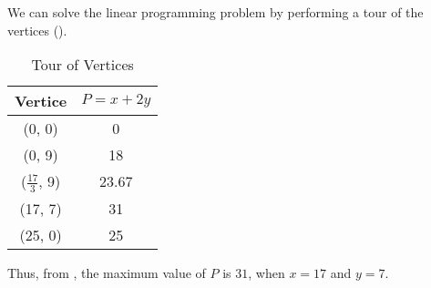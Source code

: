 \begin{subquestions}
\begin{subsubquestions}
\subsubquestion

We can solve the linear programming problem by performing a tour of the vertices ().

\begin{table}[H]
	\centering
	\begin{tabular}{|c|c|}
		\hline
		Vertice & $P = x + 2y$ \\
		\hline
		(0, 0) & 0 \\
		(0, 9) & 18 \\
		($\frac{17}{3}$, 9) & 23.67 \\
		(17, 7) & 31 \\
		(25, 0) & 25 \\
		\hline
	\end{tabular}
	\caption{\label{2010:q1:tab:P} Tour of Vertices}
\end{table}

Thus, from , the maximum value of $P$ is $31$, when $x=17$ and $y=7$.

\end{subsubquestions}


\subquestion

\begin{subsubquestions}
	

\subsubquestion


\end{subsubquestions}
\end{subquestions}

